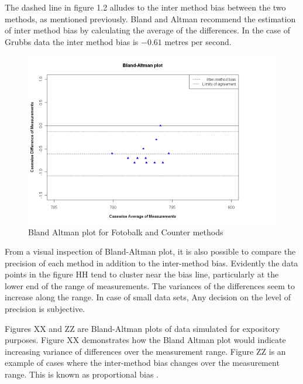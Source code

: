 \documentclass[12pt, a4paper]{report}
\begin{document}
The dashed line in figure 1.2 alludes to the inter method bias
between the two methods, as mentioned previously. Bland and Altman
recommend the estimation of inter method bias by calculating the
average of the differences. In the case of Grubbs data the inter
method bias is $-0.61$ metres per second.
\newpage
\begin{figure}[h!]
\begin{center}
  \includegraphics[width=120mm]{GrubbsBAplot.jpeg}
  \caption{Bland Altman plot for Fotobalk and Counter methods}\label{GrubbsBA}
\end{center}
\end{figure}

From a visual inspection of Bland-Altman plot, it is also possible
to compare the precision of each method in addition to the
inter-method bias.  Evidently the data points in the figure HH
tend to cluster near the bias line, particularly at the lower end
of the range of measurements. The variances of the differences
seem to increase along the range. In case of small data sets, Any
decision on the level of precision is subjective.

Figures XX and ZZ are Bland-Altman plots of data simulated for
expository purposes. Figure XX demonstrates how the Bland Altman
plot would indicate increasing variance of differences over the
measurement range. Figure ZZ is an example of cases where the
inter-method bias changes over the measurement range. This is
known as proportional bias \citep{ludbrook97}.
\end{document}
